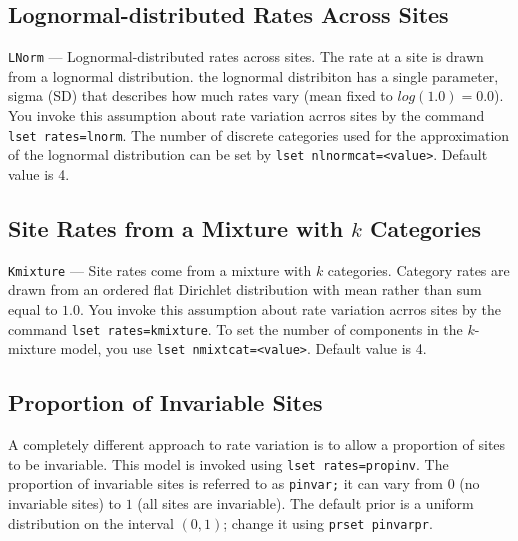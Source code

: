 \documentclass[12pt]{book}
\begin{document}
\subsection{Lognormal-distributed Rates Across Sites}

\texttt{LNorm} --- Lognormal-distributed rates across sites. The rate at a site is drawn from a
lognormal distribution. the lognormal distribiton has a single parameter, sigma (SD) that describes
how much rates vary (mean fixed to $log(1.0) = 0.0$). You invoke this assumption about rate
variation acrros sites by the command \texttt{lset rates=lnorm}. The number of discrete categories
used for the approximation of the lognormal distribution can be set by \texttt{lset
nlnormcat=<value>}. Default value is 4.

\subsection{Site Rates from a Mixture with $k$ Categories}

\texttt{Kmixture} --- Site rates come from a mixture with $k$ categories. Category rates are drawn
from an ordered flat Dirichlet distribution with mean rather than sum equal to $1.0$. You invoke
this assumption about rate variation acrros sites by the command \texttt{lset rates=kmixture}. To
set the number of components in the $k$-mixture model, you use \texttt{lset nmixtcat=<value>}.
Default value is 4.

\subsection{Proportion of Invariable Sites}

A completely different approach to rate variation is to allow a proportion of sites to be
invariable. This model is invoked using \texttt{lset rates=propinv}. The proportion of invariable
sites is referred to as \texttt{pinvar;} it can vary from $0$ (no invariable sites) to $1$ (all
sites are invariable). The default prior is a uniform distribution on the interval $(0,1)$; change
it using \texttt{prset pinvarpr}.
\end{document}
